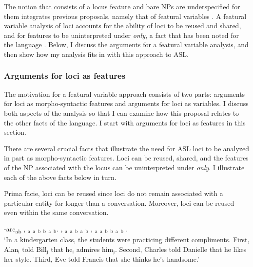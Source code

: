 \documentclass[output=paper,
modfonts
]{langscibook}
\begin{document}
The notion that  consists of a locus feature and bare NPs are underspecified for them integrates previous proposals, namely that of featural variables \citep{Schlenker2014}. A featural variable analysis of loci accounts for the ability of loci to be reused and shared, and for features to be uninterpreted under \textit{only}, a fact that has been noted for the language \citep{Kuhn2015}. Below, I discuss the arguments for a featural variable analysis, and then show how my analysis fits in with this approach to ASL. 

\subsubsection{Arguments for loci as features}

The motivation for a featural variable approach consists of two parts: arguments for loci as morpho-syntactic features and arguments for loci as variables. I discuss both aspects of the analysis so that I can examine how this proposal relates to the other facts of the language. I start with arguments for loci as features in this section. 

There are several crucial facts that illustrate the need for ASL loci to be analyzed in part as morpho-syntactic features. Loci can be reused, shared, and the features of the NP associated with the locus can be uninterpreted under \textit{only}. I illustrate each of the above facts below in turn. 

Prima facie, loci can be reused since loci do not remain associated with a particular entity for longer than a conversation. Moreover, loci can be reused even within the same conversation.

\begin{exe} 
	\ex \label{ex:irani:68}  -arc\textsubscript{ab}  , $_\text{a}$ $_\text{a}$  $_\text{b}$ $_\text{b}$ $_\text{a}$  $_\text{b}$. , $_\text{a}$ $_\text{a}$  $_\text{b}$  $_\text{a}$ $_\text{b}$ , $_\text{a}$ $_\text{a}$  $_\text{b}$ $_\text{b}$ $_\text{a}$  $_\text{b}$ .\\
	`In a kindergarten class, the students were practicing different compliments. First, Alan$_\text{i}$ told Bill$_\text{j}$ that he$_\text{i}$ admires him$_\text{j}$. Second, Charles told Danielle that he likes her style. Third, Eve told Francis that she thinks he's handsome.' \citep[adapted from][462]{Kuhn2015}
\end{exe} 
\end{document}
